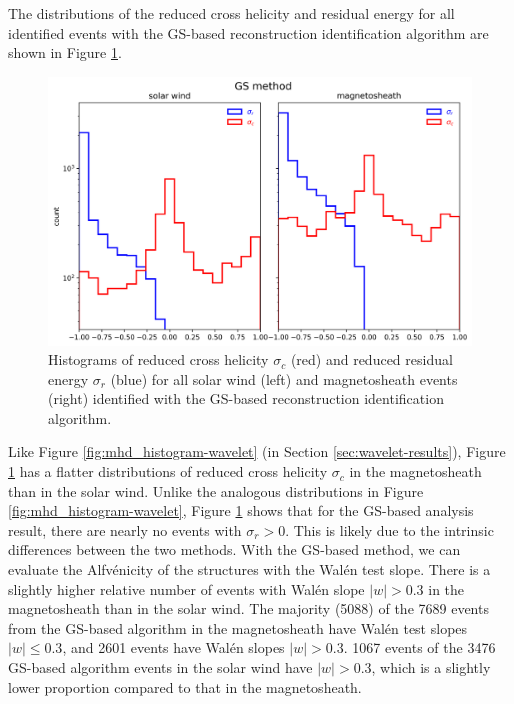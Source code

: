 
The distributions of the reduced cross helicity and residual energy for all identified events with the GS-based reconstruction identification algorithm are shown in Figure \ref{fig:mhd_histogram-GS}.

\begin{figure}
    \centering
    \includegraphics[width=\textwidth]{Figures/Histograms/sigr_sigc_GS.png}
    \caption[Reduced cross helicity and reduced residual energy for all events identified via GS-based reconstruction algorithm]{Histograms of reduced cross helicity $\sigma_c$ (red) and reduced residual energy $\sigma_r$ (blue) for all solar wind (left) and magnetosheath events (right) identified with the GS-based reconstruction identification algorithm.}
    \label{fig:mhd_histogram-GS}
\end{figure}

Like Figure \ref{fig:mhd_histogram-wavelet} (in Section \ref{sec:wavelet-results}), Figure \ref{fig:mhd_histogram-GS} has a flatter distributions of reduced cross helicity $\sigma_c$ in the magnetosheath than in the solar wind. Unlike the analogous distributions in Figure \ref{fig:mhd_histogram-wavelet}, Figure \ref{fig:mhd_histogram-GS} shows that for the GS-based analysis result, there are nearly no events with $\sigma_r>0$. This is likely due to the intrinsic differences between the two methods. With the GS-based method, we can evaluate the Alfv\'enicity of the structures with the Wal\'en test slope. There is a slightly higher relative number of events with Wal\'en slope $|w|>0.3$ in the magnetosheath than in the solar wind. The majority (5088) of the 7689 events from the GS-based algorithm in the magnetosheath have Wal\'en test slopes $|w|\leq 0.3$, and 2601 events have Wal\'en slopes $|w|>0.3$. 1067 events of the 3476 GS-based algorithm events in the solar wind have $|w|>0.3$, which is a slightly lower proportion compared to that in the magnetosheath.

